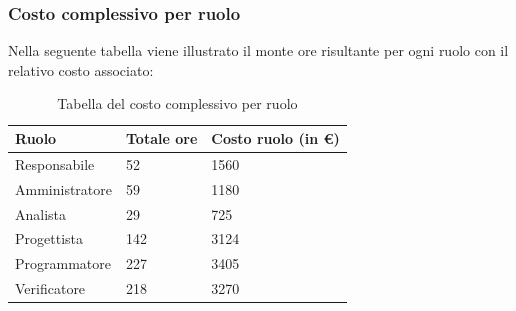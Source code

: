 \subsubsection{Costo complessivo per ruolo}
Nella seguente tabella viene illustrato il monte ore risultante per ogni ruolo con il relativo costo associato:
{
\renewcommand{\arraystretch}{2}
\begin{longtable}{ C{3cm} C{2cm} C{4cm}}
\caption{Tabella del costo complessivo per ruolo}\\
\rowcolor{\primaryColor}

\textcolor{\secondaryColor}{\textbf{Ruolo}} & 
\textcolor{\secondaryColor}{\textbf{Totale ore}} & 
\textcolor{\secondaryColor}{\textbf{Costo ruolo (in \euro{})}}\\	
\endhead
        
Responsabile   &  52 & 1560 \\
Amministratore &  59 & 1180 \\
Analista       &  29 & 725 \\
Progettista    &  142 & 3124 \\
Programmatore  &  227 & 3405 \\
Verificatore   &  218 & 3270 \\
        	
\end{longtable}
}



